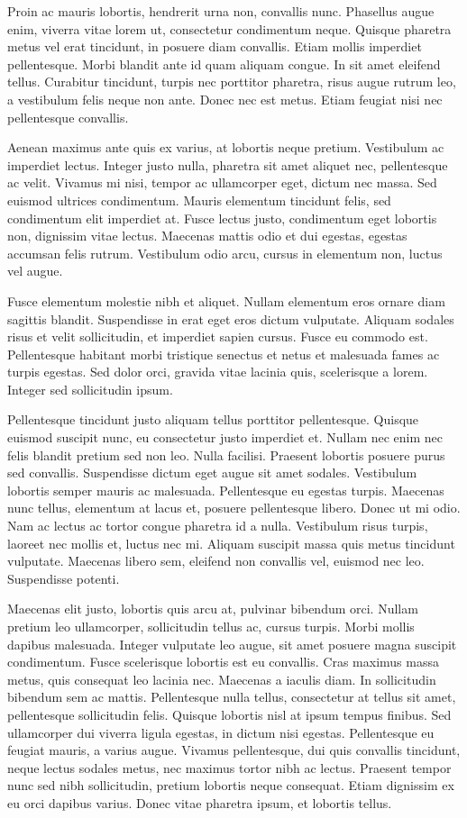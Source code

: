 Proin ac mauris lobortis, hendrerit urna non, convallis nunc. Phasellus augue enim, viverra vitae lorem ut, consectetur condimentum neque. Quisque pharetra metus vel erat tincidunt, in posuere diam convallis. Etiam mollis imperdiet pellentesque. Morbi blandit ante id quam aliquam congue. In sit amet eleifend tellus. Curabitur tincidunt, turpis nec porttitor pharetra, risus augue rutrum leo, a vestibulum felis neque non ante. Donec nec est metus. Etiam feugiat nisi nec pellentesque convallis.

Aenean maximus ante quis ex varius, at lobortis neque pretium. Vestibulum ac imperdiet lectus. Integer justo nulla, pharetra sit amet aliquet nec, pellentesque ac velit. Vivamus mi nisi, tempor ac ullamcorper eget, dictum nec massa. Sed euismod ultrices condimentum. Mauris elementum tincidunt felis, sed condimentum elit imperdiet at. Fusce lectus justo, condimentum eget lobortis non, dignissim vitae lectus. Maecenas mattis odio et dui egestas, egestas accumsan felis rutrum. Vestibulum odio arcu, cursus in elementum non, luctus vel augue.

Fusce elementum molestie nibh et aliquet. Nullam elementum eros ornare diam sagittis blandit. Suspendisse in erat eget eros dictum vulputate. Aliquam sodales risus et velit sollicitudin, et imperdiet sapien cursus. Fusce eu commodo est. Pellentesque habitant morbi tristique senectus et netus et malesuada fames ac turpis egestas. Sed dolor orci, gravida vitae lacinia quis, scelerisque a lorem. Integer sed sollicitudin ipsum.

Pellentesque tincidunt justo aliquam tellus porttitor pellentesque. Quisque euismod suscipit nunc, eu consectetur justo imperdiet et. Nullam nec enim nec felis blandit pretium sed non leo. Nulla facilisi. Praesent lobortis posuere purus sed convallis. Suspendisse dictum eget augue sit amet sodales. Vestibulum lobortis semper mauris ac malesuada. Pellentesque eu egestas turpis. Maecenas nunc tellus, elementum at lacus et, posuere pellentesque libero. Donec ut mi odio. Nam ac lectus ac tortor congue pharetra id a nulla. Vestibulum risus turpis, laoreet nec mollis et, luctus nec mi. Aliquam suscipit massa quis metus tincidunt vulputate. Maecenas libero sem, eleifend non convallis vel, euismod nec leo. Suspendisse potenti.

Maecenas elit justo, lobortis quis arcu at, pulvinar bibendum orci. Nullam pretium leo ullamcorper, sollicitudin tellus ac, cursus turpis. Morbi mollis dapibus malesuada. Integer vulputate leo augue, sit amet posuere magna suscipit condimentum. Fusce scelerisque lobortis est eu convallis. Cras maximus massa metus, quis consequat leo lacinia nec. Maecenas a iaculis diam. In sollicitudin bibendum sem ac mattis. Pellentesque nulla tellus, consectetur at tellus sit amet, pellentesque sollicitudin felis. Quisque lobortis nisl at ipsum tempus finibus. Sed ullamcorper dui viverra ligula egestas, in dictum nisi egestas. Pellentesque eu feugiat mauris, a varius augue. Vivamus pellentesque, dui quis convallis tincidunt, neque lectus sodales metus, nec maximus tortor nibh ac lectus. Praesent tempor nunc sed nibh sollicitudin, pretium lobortis neque consequat. Etiam dignissim ex eu orci dapibus varius. Donec vitae pharetra ipsum, et lobortis tellus.

